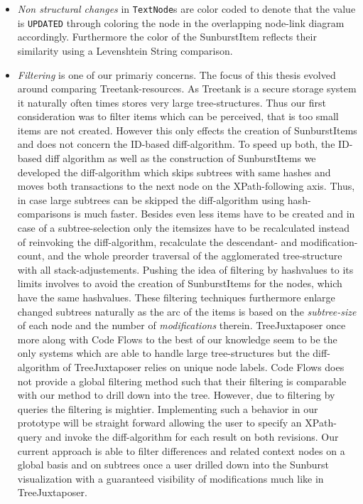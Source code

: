 \begin{itemize}
\item \emph{Non structural changes} in \texttt{TextNode}s are color coded to denote that the value is \texttt{UPDATED} through coloring the node in the overlapping node-link diagram accordingly. Furthermore the color of the SunburstItem reflects their similarity using a Levenshtein String comparison.
\item \emph{Filtering} is one of our primariy concerns. The focus of this thesis evolved around comparing Treetank-resources. As Treetank is a secure storage system it naturally often times stores very large tree-structures. Thus our first consideration was to filter items which can be perceived, that is too small items are not created. However this only effects the creation of SunburstItems and does not concern the ID-based diff-algorithm. To speed up both, the ID-based diff algorithm as well as the construction of SunburstItems we developed the diff-algorithm which skips subtrees with same hashes and moves both transactions to the next node on the XPath-following axis. Thus, in case large subtrees can be skipped the diff-algorithm using hash-comparisons is much faster. Besides even less items have to be created and in case of a subtree-selection only the itemsizes have to be recalculated instead of reinvoking the diff-algorithm, recalculate the descendant- and modification-count, and the whole preorder traversal of the agglomerated tree-structure with all stack-adjustements. Pushing the idea of filtering by hashvalues to its limits involves to avoid the creation of SunburstItems for the nodes, which have the same hashvalues. These filtering techniques furthermore enlarge changed subtrees naturally as the arc of the items is based on the \emph{subtree-size} of each node and the number of \emph{modifications} therein. TreeJuxtaposer once more along with Code Flows to the best of our knowledge seem to be the only systems which are able to handle large tree-structures but the diff-algorithm of TreeJuxtaposer relies on unique node labels. Code Flows does not provide a global filtering method such that their filtering is comparable with our method to drill down into the tree. However, due to filtering by queries the filtering is mightier. Implementing such a behavior in our prototype will be straight forward allowing the user to specify an XPath-query and invoke the diff-algorithm for each result on both revisions. Our current approach is able to filter differences and related context nodes on a global basis and on subtrees once a user drilled down into the Sunburst visualization with a guaranteed visibility of modifications much like in TreeJuxtaposer.
\end{itemize}

